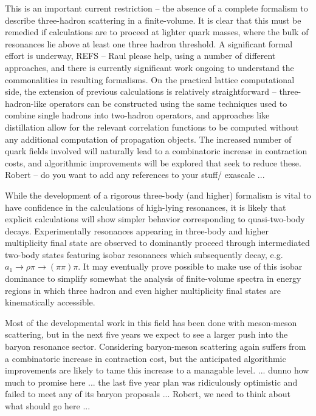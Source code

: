 This is an important current restriction -- the absence of a complete formalism to describe three-hadron scattering in a finite-volume. It is clear that this must be remedied if calculations are to proceed at lighter quark masses, where the bulk of resonances lie above at least one three hadron threshold. A significant formal effort is underway, {\color{red}REFS -- Raul please help}, using a number of different approaches, and there is currently significant work ongoing to understand the commonalities in resulting formalisms. On the practical lattice computational side, the extension of previous calculations is relatively straightforward -- three-hadron-like operators can be constructed using the same techniques used to combine single hadrons into two-hadron operators, and approaches like distillation allow for the relevant correlation functions to be computed without any additional computation of propagation objects. The increased number of quark fields involved will naturally lead to a combinatoric increase in contraction costs, and algorithmic improvements will be explored that seek to reduce these. {\color{red} Robert -- do you want to add any references to your stuff/ exascale ...}

While the development of a rigorous three-body (and higher) formalism is vital to have confidence in the calculations of high-lying resonances, it is likely that explicit calculations will show simpler behavior corresponding to quasi-two-body decays. Experimentally resonances appearing in three-body and higher multiplicity final state are observed to dominantly proceed through intermediated two-body states featuring isobar resonances which subsequently decay, e.g. $a_1 \to \rho \pi \to (\pi\pi) \pi$. It may eventually prove possible to make use of this isobar dominance to simplify somewhat the analysis of finite-volume spectra in energy regions in which three hadron and even higher multiplicity final states are kinematically accessible.

Most of the developmental work in this field has been done with meson-meson scattering, but in the next five years we expect to see a larger push into the baryon resonance sector. Considering baryon-meson scattering again suffers from a combinatoric increase in contraction cost, but the anticipated algorithmic improvements are likely to tame this increase to a managable level.
... {\color{red} dunno how much to promise here ... the last five year plan was ridiculously optimistic and failed to meet any of its baryon proposals ... Robert, we need to think about what should go here ...}

